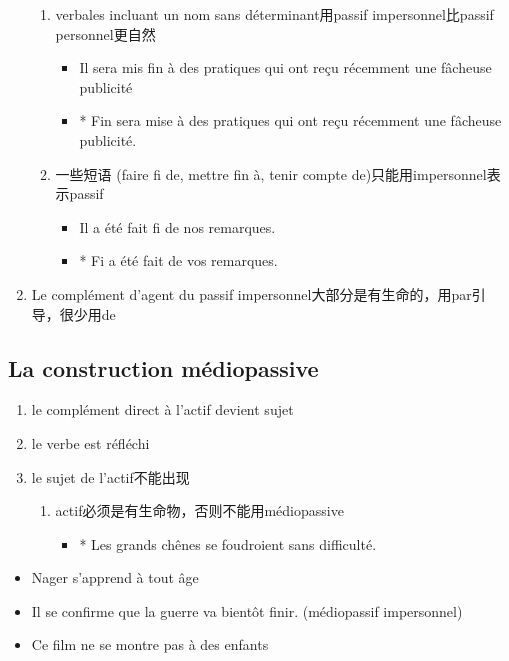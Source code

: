 \documentclass[UTF8]{report}
\begin{document}
\begin{enumerate}
    \begin{enumerate}
        \item verbales incluant un nom sans déterminant用passif impersonnel比passif personnel更自然
        \begin{itemize}
            \item Il sera mis fin à des pratiques qui ont reçu récemment une fâcheuse publicité
            \item * Fin sera mise à des pratiques qui ont reçu récemment une fâcheuse publicité.
        \end{itemize}
        \item 一些短语 (faire fi de, mettre fin à, tenir compte de)只能用impersonnel表示passif
        \begin{itemize}
            \item Il a été fait fi de nos remarques.
            \item * Fi a été fait de vos remarques.
        \end{itemize}
    \end{enumerate}
    \item Le complément d’agent du passif impersonnel大部分是有生命的，用par引导，很少用de
\end{enumerate}

\subsection{La construction médiopassive}

\begin{enumerate}
    \item le complément direct à l’actif devient sujet
    \item le verbe est réfléchi
    \item le sujet de l’actif不能出现
    \begin{enumerate}
        \item actif必须是有生命物，否则不能用médiopassive
        \begin{itemize}
            \item * Les grands chênes se foudroient sans difficulté.
        \end{itemize}
    \end{enumerate}
\end{enumerate}
\begin{itemize}
    \item Nager s’apprend à tout âge
    \item Il se confirme que la guerre va bientôt finir. (médiopassif impersonnel)
    \item  Ce film ne se montre pas à des enfants
\end{itemize}
\end{document}
